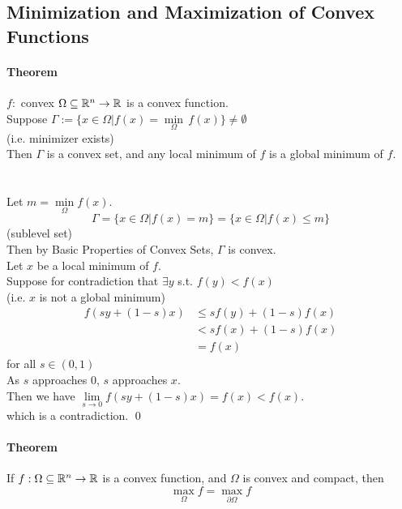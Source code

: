 \documentclass[11pt]{article}
\begin{document}
\subsection{Minimization and Maximization of Convex Functions}
\paragraph{Theorem}
$f:$ convex $\Omega \subseteq \mathbb{R}^n \rightarrow \mathbb{R}$ is a convex function. \\
Suppose $\Gamma := \{ x \in \Omega | f(x) = \underset{\Omega}{\min} \, f(x)\} \neq \emptyset$\\
(i.e. minimizer exists) \\
Then $\Gamma$ is a convex set, and any local minimum of $f$ is a global minimum of $f$. \\
 \\\\
Let $m = \underset{\Omega}{\min} f(x)$.
$$\Gamma = \{ x \in \Omega | f(x) = m\} = \{ x \in \Omega | f(x) \leq m \}$$
(sublevel set) \\
Then by Basic Properties of Convex Sets, $\Gamma$ is convex. \\
Let $x$ be a local minimum of $f$.\\
Suppose for contradiction that $\exists y$ s.t. $f(y) < f(x)$ \\
(i.e. $x$ is not a global minimum)
\begin{align*}
	f(sy + (1-s)x) &\leq sf(y) + (1-s)f(x) \\
	&< sf(x) + (1-s)f(x) \tag{$f(y) < f(x)$}\\
	&= f(x)
\end{align*}
for all $s \in (0,1)$ \\
As $s$ approaches 0, $s$ approaches $x$. \\
Then we have
$\underset{s \rightarrow 0}{\lim} f(sy + (1-s)x) = f(x) < f(x)$.\\
which is a contradiction. \qed


\paragraph{Theorem}
If $f: \Omega \subseteq \mathbb{R}^n \rightarrow \mathbb{R}$ is a convex function, and $\Omega$ is convex and compact, then $$\underset{\Omega}{\max} f = \underset{\partial \Omega}{\max} f$$
\end{document}
